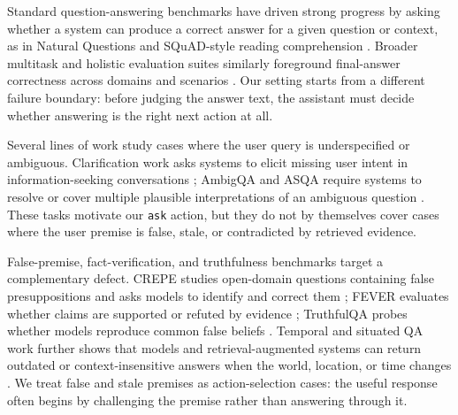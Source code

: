 Standard question-answering benchmarks have driven strong progress by asking whether a system can produce a correct answer for a given question or context, as in Natural Questions and SQuAD-style reading comprehension \citep{kwiatkowski-etal-2019-natural,rajpurkar-etal-2018-know}. Broader multitask and holistic evaluation suites similarly foreground final-answer correctness across domains and scenarios \citep{hendrycks-etal-2021-mmlu,srivastava-etal-2023-bigbench,liang-etal-2023-helm}. Our setting starts from a different failure boundary: before judging the answer text, the assistant must decide whether answering is the right next action at all.

Several lines of work study cases where the user query is underspecified or ambiguous. Clarification work asks systems to elicit missing user intent in information-seeking conversations \citep{aliannejadi-etal-2019-asking}; AmbigQA and ASQA require systems to resolve or cover multiple plausible interpretations of an ambiguous question \citep{min-etal-2020-ambigqa,stelmakh-etal-2022-asqa}. These tasks motivate our \texttt{ask} action, but they do not by themselves cover cases where the user premise is false, stale, or contradicted by retrieved evidence.

False-premise, fact-verification, and truthfulness benchmarks target a complementary defect. CREPE studies open-domain questions containing false presuppositions and asks models to identify and correct them \citep{yu-etal-2023-crepe}; FEVER evaluates whether claims are supported or refuted by evidence \citep{thorne-etal-2018-fever}; TruthfulQA probes whether models reproduce common false beliefs \citep{lin-etal-2022-truthfulqa}. Temporal and situated QA work further shows that models and retrieval-augmented systems can return outdated or context-insensitive answers when the world, location, or time changes \citep{kasai-etal-2023-realtimeqa,vu-etal-2023-freshllms,zhang-choi-2021-situatedqa}. We treat false and stale premises as action-selection cases: the useful response often begins by challenging the premise rather than answering through it.

